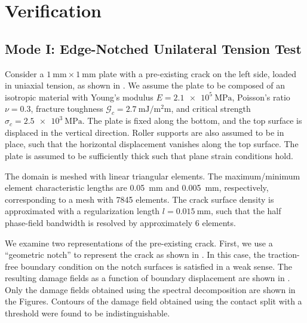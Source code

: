 \section{Verification}
\label{section: cohesive/verification}

\subsection{Mode I: Edge-Notched Unilateral Tension Test}
Consider a $\SI{1}{\milli\meter} \times \SI{1}{\milli\meter}$ plate with a pre-existing crack on the left side, loaded in uniaxial tension, as shown in . We assume the plate to be composed of an isotropic material with Young's modulus $E = \SI{2.1e5}{\mega\pascal}$, Poisson's ratio $\nu = 0.3$, fracture toughness $\mathcal{G}_c = \SI{2.7}{\milli\joule\per\square\milli\meter}$, and critical strength $\sigma_c = \SI{2.5e3}{\mega\pascal}$.
The plate is fixed along the bottom, and the top surface is displaced in the vertical direction.  Roller supports are also assumed to be in place, such that the horizontal displacement vanishes along the top surface. The plate is assumed to be sufficiently thick such that plane strain conditions hold.

The domain is meshed with linear triangular elements.
The maximum/minimum element characteristic lengths are \SI{0.05}{\milli\meter} and \SI{0.005}{\milli\meter}, respectively, corresponding to a mesh with 7845  elements. The crack surface density is approximated with a regularization length $l = \SI{0.015}{\milli\meter}$, such that the half phase-field bandwidth is resolved by approximately 6 elements.



We examine two representations of the pre-existing crack. First, we use a ``geometric notch'' to represent the crack as shown in . In this case, the traction-free boundary condition on the notch surfaces is satisfied in a weak sense.
The resulting damage fields as a function of boundary displacement are shown in .
Only the damage fields obtained using the spectral decomposition are shown in the Figures.  Contours of the damage field obtained using the contact split with a threshold were found to be indistinguishable.


